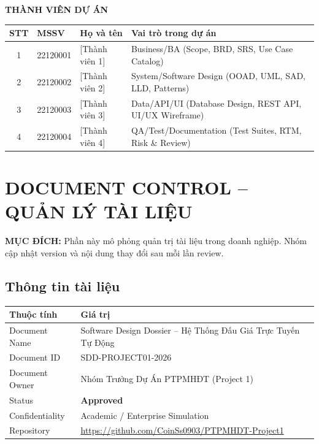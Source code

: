 \documentclass[11pt,a4paper]{article}
\begin{document}
\vspace{0.2cm}

\noindent \textbf{\large THÀNH VIÊN DỰ ÁN}
\begin{table}[H]
    \centering
    \small
    \begin{tabularx}{\textwidth}{|c|l|l|X|}
        \hline
        \textbf{STT} & \textbf{MSSV} & \textbf{Họ và tên} & \textbf{Vai trò trong dự án} \\ \hline
        1 & 22120001 & [Thành viên 1] & Business/BA (Scope, BRD, SRS, Use Case Catalog) \\ \hline
        2 & 22120002 & [Thành viên 2] & System/Software Design (OOAD, UML, SAD, LLD, Patterns) \\ \hline
        3 & 22120003 & [Thành viên 3] & Data/API/UI (Database Design, REST API, UI/UX Wireframe) \\ \hline
        4 & 22120004 & [Thành viên 4] & QA/Test/Documentation (Test Suites, RTM, Risk \& Review) \\ \hline
    \end{tabularx}
\end{table}

\newpage
\tableofcontents
\newpage

\setcounter{section}{-1}
\section{DOCUMENT CONTROL -- QUẢN LÝ TÀI LIỆU}

\begin{tcolorbox}[colback=lightgray,colframe=bordergray,arc=2mm]
    \small \textbf{MỤC ĐÍCH:} Phần này mô phỏng quản trị tài liệu trong doanh nghiệp. Nhóm cập nhật version và nội dung thay đổi sau mỗi lần review.
\end{tcolorbox}

\subsection{Thông tin tài liệu}
\begin{table}[H]
    \centering
    \small
    \begin{tabularx}{\textwidth}{|l|X|}
        \hline
        \textbf{Thuộc tính} & \textbf{Giá trị} \\ \hline
        Document Name & Software Design Dossier -- Hệ Thống Đấu Giá Trực Tuyến Tự Động \\ \hline
        Document ID & SDD-PROJECT01-2026 \\ \hline
        Document Owner & Nhóm Trưởng Dự Án PTPMHĐT (Project 1) \\ \hline
        Status & \textbf{Approved} \\ \hline
        Confidentiality & Academic / Enterprise Simulation \\ \hline
        Repository & \url{https://github.com/CoinSs0903/PTPMHDT-Project1} \\ \hline
    \end{tabularx}
\end{table}
\end{document}
